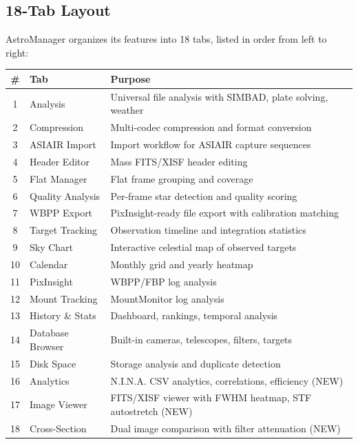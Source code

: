 \documentclass[11pt,a4paper]{article}
\newcommand{\rowmark}{\rowcolor{rowlight}}
\begin{document}
\subsection{18-Tab Layout}

AstroManager organizes its features into 18 tabs, listed in order from left to right:

\begin{center}
\begin{tabular}{clp{8cm}}
\toprule
\textbf{\#} & \textbf{Tab} & \textbf{Purpose} \\
\midrule
1 & Analysis & Universal file analysis with SIMBAD, plate solving, weather \\
2 & Compression & Multi-codec compression and format conversion \\
3 & ASIAIR Import & Import workflow for ASIAIR capture sequences \\
4 & Header Editor & Mass FITS/XISF header editing \\
5 & Flat Manager & Flat frame grouping and coverage \\
\rowmark 6 & Quality Analysis & Per-frame star detection and quality scoring \\
\rowmark 7 & WBPP Export & PixInsight-ready file export with calibration matching \\
8 & Target Tracking & Observation timeline and integration statistics \\
\rowmark 9 & Sky Chart & Interactive celestial map of observed targets \\
\rowmark 10 & Calendar & Monthly grid and yearly heatmap \\
11 & PixInsight & WBPP/FBP log analysis \\
12 & Mount Tracking & MountMonitor log analysis \\
13 & History \& Stats & Dashboard, rankings, temporal analysis \\
14 & Database Browser & Built-in cameras, telescopes, filters, targets \\
15 & Disk Space & Storage analysis and duplicate detection \\
\rowmark 16 & Analytics & N.I.N.A. CSV analytics, correlations, efficiency (NEW) \\
\rowmark 17 & Image Viewer & FITS/XISF viewer with FWHM heatmap, STF autostretch (NEW) \\
\rowmark 18 & Cross-Section & Dual image comparison with filter attenuation (NEW) \\
\bottomrule
\end{tabular}
\end{center}
\end{document}
